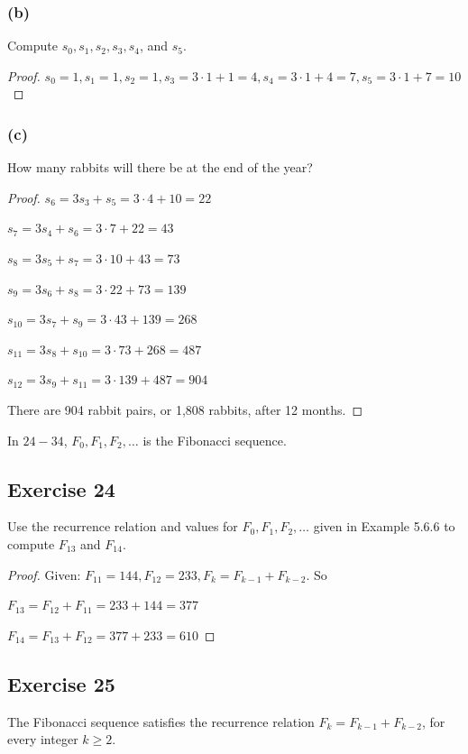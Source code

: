 \documentclass[14pt]{extarticle}
\newcommand{\cy}{\color{cyan}}
\begin{document}
\subsubsection{(b)}
Compute $s_0, s_1, s_2, s_3, s_4$, and $s_5$.

\begin{proof}
$s_0 = 1, s_1 = 1, s_2 = 1, s_3 = 3 \cdot 1 + 1 = 4, s_4 = 3 \cdot 1 + 4 = 7, s_5 = 3 \cdot 1 + 7 = 10$
\end{proof}

\subsubsection{(c)}
How many rabbits will there be at the end of the year?

\begin{proof}
$s_6 = 3s_3 + s_5 = 3 \cdot 4 + 10 = 22$

$s_7 = 3s_4 + s_6 = 3 \cdot 7 + 22 = 43$

$s_8 = 3s_5 + s_7 = 3 \cdot 10 + 43 = 73$

$s_9 = 3s_6 + s_8 = 3 \cdot 22 + 73 = 139$

$s_{10} = 3s_7 + s_9 = 3 \cdot 43 + 139 = 268$

$s_{11} = 3s_8 + s_{10} = 3 \cdot 73 + 268 = 487$

$s_{12} = 3s_9 + s_{11} = 3 \cdot 139 + 487 = 904$

There are 904 rabbit pairs, or 1,808 rabbits, after 12 months.
\end{proof}

{\cy In $24-34$, $F_0, F_1, F_2, \ldots$ is the Fibonacci sequence.}

\subsection{Exercise 24}
Use the recurrence relation and values for $F_0, F_1, F_2, \ldots$ given in Example 5.6.6 to compute $F_{13}$ and $F_{14}$.

\begin{proof}
Given: $F_{11} = 144, F_{12} = 233, F_k = F_{k-1} + F_{k-2}$. So

$F_{13} = F_{12} + F_{11} = 233 + 144 = 377$

$F_{14} = F_{13} + F_{12} = 377 + 233 = 610$
\end{proof}

\subsection{Exercise 25}
The Fibonacci sequence satisfies the recurrence relation $F_k = F_{k - 1} + F_{k - 2}$, for every integer $k \geq 2$.
\end{document}
